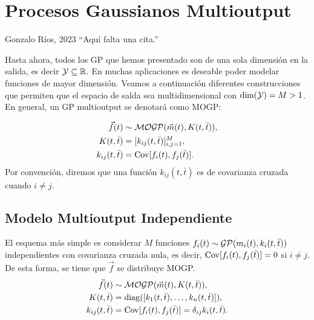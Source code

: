 
\chapter{Procesos Gaussianos Multioutput}

\begin{chapquote}{Gonzalo Ríos, 2023}
	``Aquí falta una cita.''
\end{chapquote}



Hasta ahora, todos los GP que hemos presentado son de una sola dimensión en la salida, es decir \(\mathcal{Y} \subseteq \mathbb{R}.\) En muchas aplicaciones es deseable poder modelar funciones de mayor dimensión. Veamos a continuación diferentes construcciones que permiten que el espacio de salda sea multidimensional con \(\dim( \mathcal{Y}) = M > 1\). En general, un GP multioutput se denotará como MOGP:

\begin{align*}
	\vec{f}(t)			&\sim \operatorname{\mathcal{MOGP}}(\vec{m}(t), K(t, \bar{t})), \\
	K(t, \bar{t})		&= [k_{ij}(t, \bar{t})]_{i,j=1}^{M}, \\
	k_{ij}(t, \bar{t})	&= \operatorname{Cov}[f_{i}(t), f_{j}(\bar{t})].
\end{align*}
Por convención, diremos que una función \(k_{ij}(t, \bar{t}) \) es de covarianza cruzada cuando \(i \neq j\).

\section{Modelo Multioutput Independiente}

El esquema más simple es considerar \(M\) funciones \(f_{i}(t) \sim \operatorname{\mathcal{GP}}(m_{i}(t), k_{i}(t, \bar{t}))\) independientes con covarianza cruzada nula, es decir, \(\operatorname{Cov}[f_{i}(t), f_{j}(\bar{t})] = 0\) si \(i \neq j\). De esta forma, se tiene que \(\vec{f}\) se distribuye MOGP.
\begin{align*}
	\vec{f}(t)			&\sim \operatorname{\mathcal{MOGP}}(\vec{m}(t), K(t, \bar{t})), \\
	K(t, \bar{t})		&= \operatorname{diag}([k_{1}(t, \bar{t}), \dotsc, k_{n}(t, \bar{t})]), \\
	k_{ij}(t, \bar{t})	&= \operatorname{Cov}[f_{i}(t), f_{j}(\bar{t})] = \delta_{ij} k_{i}(t, \bar{t}).
\end{align*}

